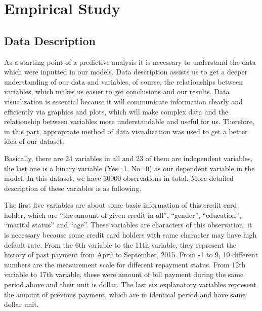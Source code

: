 \documentclass[a4paper,11pt]{article}
\begin{document}
\newpage
\section{Empirical Study}
\subsection{Data Description}
As a starting point of a predictive analysis it is necessary to understand the data which were inputted in our models. Data description assists us to get a deeper understanding of our data and variables, of course, the relationships between variables, which makes us easier to get conclusions and our results. Data visualization is essential because it will communicate information clearly and efficiently via graphics and plots, which will make complex data and the relationship between variables more understandable and useful for us. Therefore, in this part, appropriate method of data visualization was used to get a better idea of our dataset.

Basically, there are 24 variables in all and 23 of them are independent variables, the last one is a binary variable (Yes=1, No=0) as our dependent variable in the model. In this dataset, we have 30000 observations in total. More detailed description of these variables is as following. 

The first five variables are about some basic information of this credit card holder, which are ``the amount of given credit in all'', ``gender'', ``education'', ``marital status'' and ``age''. These variables are characters of this observation; it is necessary because some credit card holders with same character may have high default rate. From the 6th variable to the 11th variable, they represent the history of past payment from April to September, 2015. From -1 to 9, 10 different numbers are the measurement scale for different repayment status. From 12th variable to 17th variable, these were amount of bill payment during the same period above and their unit is dollar. The last six explanatory variables represent the amount of previous payment, which are in identical period and have same dollar unit. 
\end{document}
